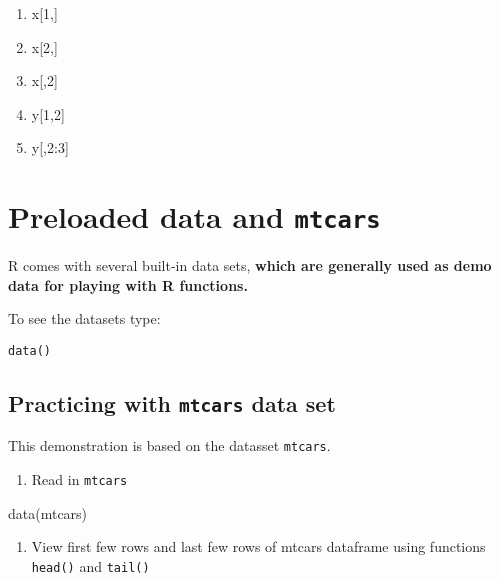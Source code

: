 \documentclass[
]{book}
\newenvironment{Shaded}{\begin{snugshade}}{\end{snugshade}}
\newcommand{\FunctionTok}[1]{\textcolor[rgb]{0.00,0.00,0.00}{#1}}
\newcommand{\NormalTok}[1]{#1}
\providecommand{\tightlist}{%
  \setlength{\itemsep}{0pt}\setlength{\parskip}{0pt}}
\begin{document}
\begin{enumerate}
\def\labelenumi{(\alph{enumi})}
\tightlist
\item
  x{[}1,{]}
\item
  x{[}2,{]}
\item
  x{[},2{]}
\item
  y{[}1,2{]}
\item
  y{[},2:3{]}
\end{enumerate}

\hypertarget{preloaded-data-and-mtcars}{%
\chapter{\texorpdfstring{Preloaded data and \texttt{mtcars}}{Preloaded data and mtcars}}\label{preloaded-data-and-mtcars}}

R comes with several built-in data sets, \textbf{which are generally used as demo data for playing with R functions.}

To see the datasets type:

\texttt{data()}

\hypertarget{practicing-with-mtcars-data-set}{%
\section{\texorpdfstring{Practicing with \texttt{mtcars} data set}{Practicing with mtcars data set}}\label{practicing-with-mtcars-data-set}}

This demonstration is based on the datasset \texttt{mtcars}.

\begin{enumerate}
\def\labelenumi{\arabic{enumi}.}
\tightlist
\item
  Read in \texttt{mtcars}
\end{enumerate}

\begin{Shaded}
\begin{Highlighting}[]
\FunctionTok{data}\NormalTok{(mtcars)}
\end{Highlighting}
\end{Shaded}

\begin{enumerate}
\def\labelenumi{\arabic{enumi}.}
\setcounter{enumi}{1}
\tightlist
\item
  View first few rows and last few rows of mtcars dataframe using functions \texttt{head()} and \texttt{tail()}
\end{enumerate}
\end{document}
